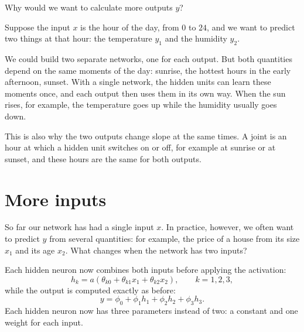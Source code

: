 \documentclass[a4paper,12pt,oneside]{report}
\begin{document}
\begin{intuitionbox}
Why would we want to calculate more outputs $y$?

Suppose the input $x$ is the hour of the day, from $0$ to $24$, and we
want to predict two things at that hour: the temperature $y_1$ and the
humidity $y_2$.

We could build two separate networks, one for each output. But both
quantities depend on the same moments of the day: sunrise, the hottest
hours in the early afternoon, sunset. With a single network, the hidden
units can learn these moments once, and each output then uses them in
its own way. When the sun rises, for example, the temperature goes up
while the humidity usually goes down.

This is also why the two outputs change slope at the same times. A
joint is an hour at which a hidden unit switches on or off, for example
at sunrise or at sunset, and these hours are the same for both outputs.
\end{intuitionbox}

\clearpage
\section{More inputs}

So far our network has had a single input $x$. In practice, however,
we often want to predict $y$ from several quantities: for example, the
price of a house from its size $x_1$ and its age $x_2$. What changes
when the network has two inputs?

Each hidden neuron now combines both inputs before applying the
activation:
\[
  h_k=a(\theta_{k0}+\theta_{k1}x_1+\theta_{k2}x_2),\qquad k=1,2,3,
\]
while the output is computed exactly as before:
\[
  y=\phi_0+\phi_1h_1+\phi_2h_2+\phi_3h_3.
\]
Each hidden neuron now has three parameters instead of two: a constant
and one weight for each input.
\begin{center}
\end{center}
\end{document}
